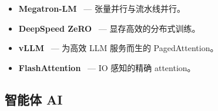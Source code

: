 \begin{itemize}
  \item \textbf{Megatron-LM}~\cite{shoeybi2019megatron} --- 张量并行与流水线并行。
  \item \textbf{DeepSpeed ZeRO}~\cite{rajbhandari2020zero} --- 显存高效的分布式训练。
  \item \textbf{vLLM}~\cite{kwon2023efficient} --- 为高效 LLM 服务而生的 PagedAttention。
  \item \textbf{FlashAttention}~\cite{dao2022flashattention} --- IO 感知的精确 attention。
\end{itemize}

\subsection{智能体 AI}
\label{agentic-ai}

